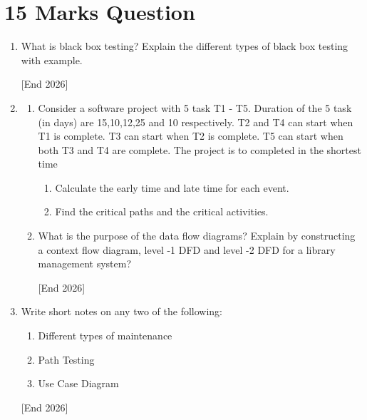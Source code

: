 \documentclass[12pt,a4paper]{article}
\begin{document}
\section{15 Marks Question}
\begin{enumerate}
    \item What is black box testing? Explain the different types of black box testing with example.

    \hfill [End 2026]
    \item \begin{enumerate}
        \item Consider a software project with 5 task T1 - T5. Duration of the 5 task (in days) are 15,10,12,25 and 10 respectively. T2 and T4 can start when T1 is complete. T3 can start when T2 is complete. T5 can start when both T3 and T4 are complete. The project is to completed in the shortest time
        \begin{enumerate}
            \item Calculate the early time and late time for each event.
            \item Find the critical paths and the critical activities.
        \end{enumerate}

        \item What is the purpose of the data flow diagrams? Explain by constructing a context flow diagram, level -1 DFD and level -2 DFD for a library management system?

        \hfill [End 2026]
    \end{enumerate}

    \item Write short notes on any two of the following:
        \begin{enumerate}
            \item Different types of maintenance
            \item Path Testing
            \item Use Case Diagram
        \end{enumerate}
        \hfill [End 2026]
\end{enumerate}
\end{document}
